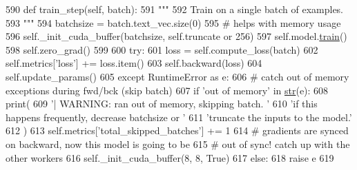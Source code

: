 \begin{DoxyCode}
590     \textcolor{keyword}{def }train\_step(self, batch):
591         \textcolor{stringliteral}{"""}
592 \textcolor{stringliteral}{        Train on a single batch of examples.}
593 \textcolor{stringliteral}{        """}
594         batchsize = batch.text\_vec.size(0)
595         \textcolor{comment}{# helps with memory usage}
596         self.\_init\_cuda\_buffer(batchsize, self.truncate \textcolor{keywordflow}{or} 256)
597         self.model.\hyperlink{namespaceprojects_1_1mastering__the__dungeon_1_1mturk_1_1tasks_1_1MTD_1_1run_a36a5f4f6f9df0611a6818610518d2cf0}{train}()
598         self.zero\_grad()
599 
600         \textcolor{keywordflow}{try}:
601             loss = self.compute\_loss(batch)
602             self.metrics[\textcolor{stringliteral}{'loss'}] += loss.item()
603             self.backward(loss)
604             self.update\_params()
605         \textcolor{keywordflow}{except} RuntimeError \textcolor{keyword}{as} e:
606             \textcolor{comment}{# catch out of memory exceptions during fwd/bck (skip batch)}
607             \textcolor{keywordflow}{if} \textcolor{stringliteral}{'out of memory'} \textcolor{keywordflow}{in} \hyperlink{namespacegenerate__task__READMEs_a5b88452ffb87b78c8c85ececebafc09f}{str}(e):
608                 print(
609                     \textcolor{stringliteral}{'| WARNING: ran out of memory, skipping batch. '}
610                     \textcolor{stringliteral}{'if this happens frequently, decrease batchsize or '}
611                     \textcolor{stringliteral}{'truncate the inputs to the model.'}
612                 )
613                 self.metrics[\textcolor{stringliteral}{'total\_skipped\_batches'}] += 1
614                 \textcolor{comment}{# gradients are synced on backward, now this model is going to be}
615                 \textcolor{comment}{# out of sync! catch up with the other workers}
616                 self.\_init\_cuda\_buffer(8, 8, \textcolor{keyword}{True})
617             \textcolor{keywordflow}{else}:
618                 \textcolor{keywordflow}{raise} e
619 
\end{DoxyCode}
\mbox{\label{classparlai_1_1core_1_1torch__generator__agent_1_1TorchGeneratorAgent_a8bb3183c7de0e8831157536c6ce1751b}} 
